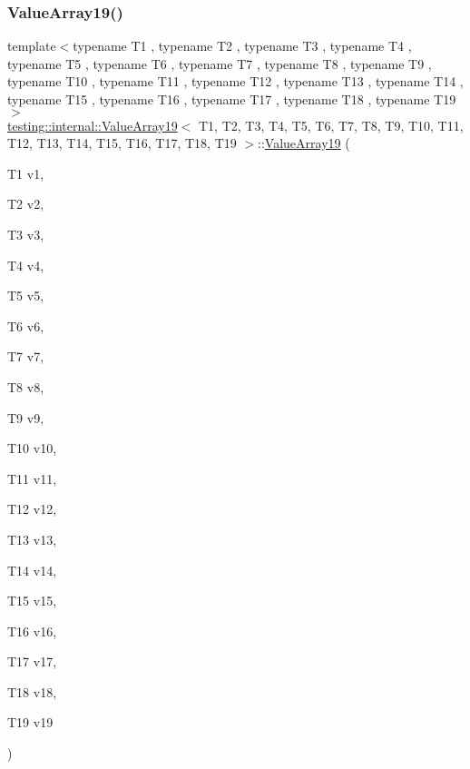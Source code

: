 \subsubsection{\texorpdfstring{ValueArray19()}{ValueArray19()}\hspace{0.1cm}{\footnotesize\ttfamily [1/2]}}
{\footnotesize\ttfamily template$<$typename T1 , typename T2 , typename T3 , typename T4 , typename T5 , typename T6 , typename T7 , typename T8 , typename T9 , typename T10 , typename T11 , typename T12 , typename T13 , typename T14 , typename T15 , typename T16 , typename T17 , typename T18 , typename T19 $>$ \\
\mbox{\hyperlink{classtesting_1_1internal_1_1_value_array19}{testing\+::internal\+::\+Value\+Array19}}$<$ T1, T2, T3, T4, T5, T6, T7, T8, T9, T10, T11, T12, T13, T14, T15, T16, T17, T18, T19 $>$\+::\mbox{\hyperlink{classtesting_1_1internal_1_1_value_array19}{Value\+Array19}} (\begin{DoxyParamCaption}\item[{T1}]{v1,  }\item[{T2}]{v2,  }\item[{T3}]{v3,  }\item[{T4}]{v4,  }\item[{T5}]{v5,  }\item[{T6}]{v6,  }\item[{T7}]{v7,  }\item[{T8}]{v8,  }\item[{T9}]{v9,  }\item[{T10}]{v10,  }\item[{T11}]{v11,  }\item[{T12}]{v12,  }\item[{T13}]{v13,  }\item[{T14}]{v14,  }\item[{T15}]{v15,  }\item[{T16}]{v16,  }\item[{T17}]{v17,  }\item[{T18}]{v18,  }\item[{T19}]{v19 }\end{DoxyParamCaption})\hspace{0.3cm}{\ttfamily [inline]}}

\mbox{\label{classtesting_1_1internal_1_1_value_array19_a1029ebc5d39633e2fb278e051d0ec1d0}} 
